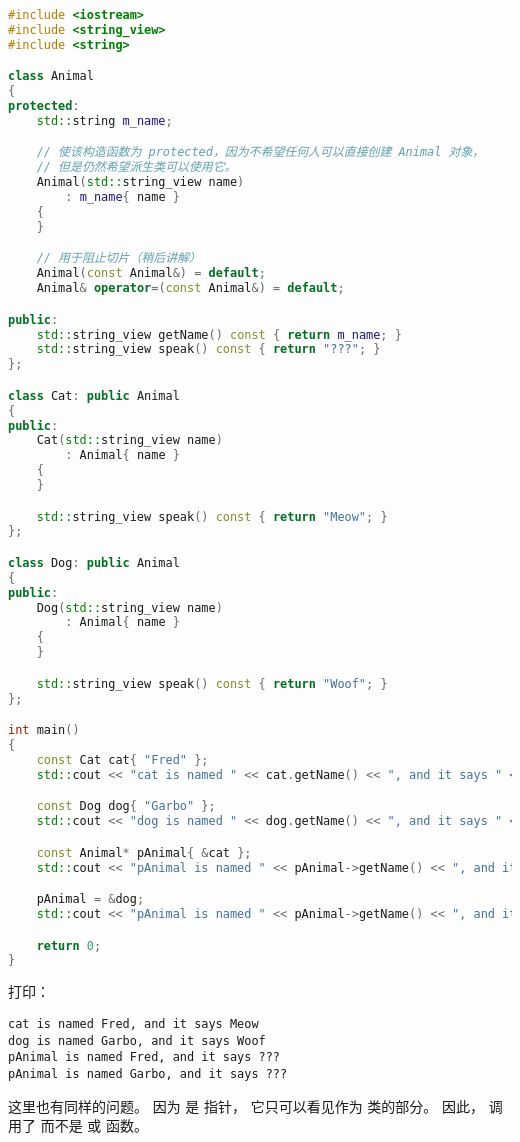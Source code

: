 \documentclass[../../LearnCpp.tex]{subfiles}
\begin{document}
\begin{lstlisting}[language=C++]
#include <iostream>
#include <string_view>
#include <string>

class Animal
{
protected:
    std::string m_name;

    // 使该构造函数为 protected，因为不希望任何人可以直接创建 Animal 对象，
    // 但是仍然希望派生类可以使用它。
    Animal(std::string_view name)
        : m_name{ name }
    {
    }

    // 用于阻止切片（稍后讲解）
    Animal(const Animal&) = default;
    Animal& operator=(const Animal&) = default;

public:
    std::string_view getName() const { return m_name; }
    std::string_view speak() const { return "???"; }
};

class Cat: public Animal
{
public:
    Cat(std::string_view name)
        : Animal{ name }
    {
    }

    std::string_view speak() const { return "Meow"; }
};

class Dog: public Animal
{
public:
    Dog(std::string_view name)
        : Animal{ name }
    {
    }

    std::string_view speak() const { return "Woof"; }
};

int main()
{
    const Cat cat{ "Fred" };
    std::cout << "cat is named " << cat.getName() << ", and it says " << cat.speak() << '\n';

    const Dog dog{ "Garbo" };
    std::cout << "dog is named " << dog.getName() << ", and it says " << dog.speak() << '\n';

    const Animal* pAnimal{ &cat };
    std::cout << "pAnimal is named " << pAnimal->getName() << ", and it says " << pAnimal->speak() << '\n';

    pAnimal = &dog;
    std::cout << "pAnimal is named " << pAnimal->getName() << ", and it says " << pAnimal->speak() << '\n';

    return 0;
}
\end{lstlisting}

打印：

\begin{lstlisting}
cat is named Fred, and it says Meow
dog is named Garbo, and it says Woof
pAnimal is named Fred, and it says ???
pAnimal is named Garbo, and it says ???
\end{lstlisting}

这里也有同样的问题。
因为  是  指针，
它只可以看见作为  类的部分。
因此， 调用了  而不是  或  函数。
\end{document}
